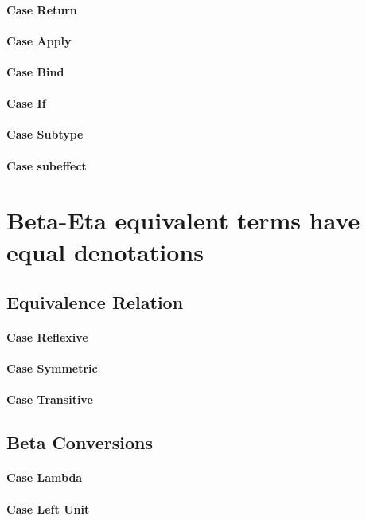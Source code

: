 {        \paragraph{Case Return}
        \paragraph{Case Apply}
        \paragraph{Case Bind}
        \paragraph{Case If}
        \paragraph{Case Subtype}
        \paragraph{Case subeffect}
\section{Beta-Eta equivalent terms have equal denotations}
    \subsection{Equivalence Relation}
        \paragraph{Case Reflexive}
        \paragraph{Case Symmetric}
        \paragraph{Case Transitive}
    \subsection{Beta Conversions}
        \paragraph{Case Lambda}
        \paragraph{Case Left Unit}
}
